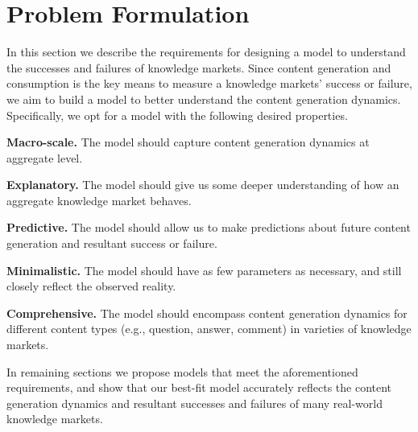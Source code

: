 \section{Problem Formulation} 
In this section we describe the requirements for designing a model to understand the successes and failures of knowledge markets. Since content generation and consumption is the key means to measure a knowledge markets' success or failure, we aim to build a model to better understand the content generation dynamics. Specifically, we opt for a model with the following desired properties.


\textbf{Macro-scale.} The model should capture content generation dynamics at aggregate level. 

\textbf{Explanatory.} The model should give us some deeper understanding of how an aggregate knowledge market behaves.

\textbf{Predictive.} The model should allow us to make predictions about future content generation and resultant success or failure.

\textbf{Minimalistic.} The model should have as few parameters as necessary, and still closely reflect the observed reality.

\textbf{Comprehensive.} The model should encompass content generation dynamics for different content types (e.g., question, answer, comment) in varieties of knowledge markets.

In remaining sections we propose models that meet the aforementioned requirements, and show that our best-fit model accurately reflects the content generation dynamics and resultant successes and failures of many real-world knowledge markets.
